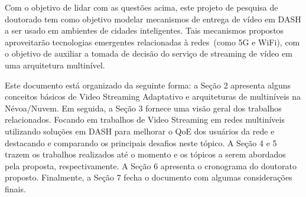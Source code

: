 




Com o objetivo de lidar com as questões acima, este projeto de pesquisa de doutorado tem como objetivo modelar mecanismos de entrega de vídeo em DASH %
a ser usado em ambientes de cidades inteligentes. Tais mecanismos propostos aproveitarão tecnologias emergentes relacionadas à redes~(como 5G e WiFi), com o objetivo de auxiliar a tomada de decisão do serviço de streaming de vídeo em uma arquitetura multinível. %

Este documento está organizado da seguinte forma: a Seção 2 apresenta
alguns conceitos básicos de Video Streaming Adaptativo e arquiteturas de multiníveis na Névoa/Nuvem. Em seguida, a Seção 3 fornece uma visão geral dos trabalhos relacionados. Focando em trabalhos de Video Streaming em redes multiníveis utilizando soluções em DASH para melhorar o QoE dos usuários da rede e destacando e comparando os principais desafios neste tópico. A Seção 4 e 5 trazem os trabalhos realizados até o momento e os tópicos a serem abordados pela proposta, respectivamente. A Seção 6 apresenta o cronograma do doutorato proposto. Finalmente, a Seção 7 fecha o documento com algumas considerações finais.
 
